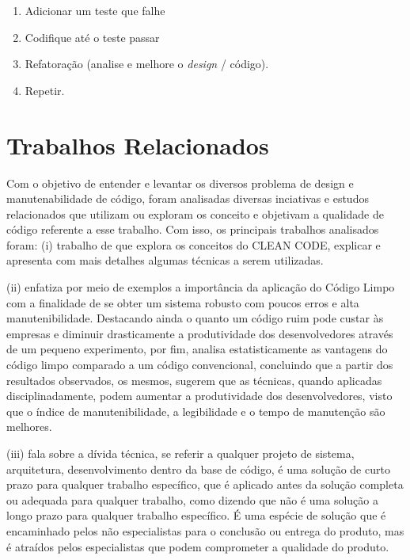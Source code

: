 \documentclass[12pt]{article}
\begin{document}
\begin{enumerate}
 \item Adicionar um teste que falhe
 \item Codifique até o teste passar
 \item Refatoração (analise e melhore o \textit{design} / código).
 \item Repetir.
\end{enumerate}

\part{Trabalhos Relacionados} \label{sec:trabalhosrelacionados}

Com o objetivo de entender e levantar os diversos problema de design e manutenabilidade de código, foram analisadas diversas inciativas e estudos relacionados que utilizam ou exploram os conceito e objetivam a qualidade de código referente a esse trabalho.
Com isso, os principais trabalhos analisados foram: (i) trabalho de \cite{TR_CLEAN_CODE_INTRODUCAO} que explora os conceitos do CLEAN CODE, explicar e apresenta com mais detalhes algumas técnicas a serem utilizadas.

 (ii) \cite{TR_CLEAN_CODE_IMPORTANCIA} enfatiza por meio de exemplos a importância da aplicação do
Código Limpo com a finalidade de se obter um sistema robusto com poucos erros e alta manutenibilidade. Destacando ainda o quanto um código ruim pode custar às empresas e diminuir drasticamente a produtividade dos desenvolvedores através de um pequeno experimento, por fim, analisa estatisticamente as vantagens do código limpo comparado a um código convencional, concluindo que a partir dos resultados observados, os mesmos, sugerem que as técnicas, quando aplicadas disciplinadamente, podem aumentar a produtividade dos desenvolvedores, visto que o índice de manutenibilidade, a legibilidade e o tempo de manutenção são melhores.
 
 (iii) \cite{TR_QC_TECHNICAL_DEBT} fala sobre a dívida técnica, se referir a qualquer projeto de sistema, arquitetura, desenvolvimento dentro da base de código, é uma solução de curto prazo para qualquer trabalho específico, que é aplicado antes da solução completa ou adequada para
qualquer trabalho, como dizendo que não é uma solução a longo prazo para qualquer trabalho específico. É uma espécie de solução que é encaminhado pelos não especialistas para o conclusão ou entrega do produto, mas é atraídos pelos especialistas que podem comprometer a qualidade do produto.
\end{document}
